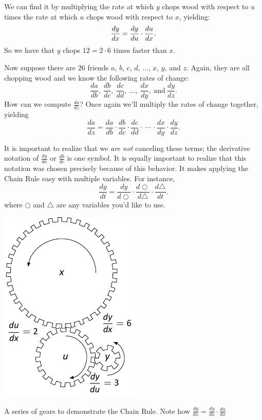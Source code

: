 We can find it by multiplying the rate at which $y$ chops wood with respect to $u$ times the rate at which $u$ chops wood with respect to $x$, yielding:
\[ \displaystyle \frac{dy}{dx} = \frac{dy}{du} \cdot \frac{du}{dx} . \]
So we have that $y$ chops $12 = 2 \cdot 6$ times faster than $x$.

Now suppose there are $26$ friends $a$, $b$, $c$, $d$, ..., $x$, $y$, and $z$.  Again, they are all chopping wood and we know the following rates of change:
\[ \frac{da}{db}, \ \frac{db}{dc}, \ \frac{dc}{dd}, \ ..., \ \frac{dx}{dy}, \ \mbox{and} \ \frac{dy}{dz}. \]
How can we compute $\frac{da}{dz}$?  Once again we'll multiply the rates of change together, yielding
\[ \frac{da}{dz} = \frac{da}{db} \cdot \frac{db}{dc} \cdot \frac{dc}{dd} \cdot \ \cdots \ \cdot \frac{dx}{dy} \cdot \frac{dy}{dz}. \]

It is important to realize that we \textit{are not} canceling these terms; the derivative notation of $\frac{dy}{dx}$ or $\frac{db}{dc}$ is one symbol. It is equally important to realize that this notation was chosen precisely because of this behavior. It makes applying the Chain Rule easy with multiple variables. For instance,
\[ \frac{dy}{dt} = \frac{dy}{d\bigcirc} \cdot \frac{d\bigcirc}{d\triangle} \cdot \frac{d\triangle}{dt}. \]
where $\bigcirc$ and $\triangle$ are any variables you'd like to use.

\begin{marginfigure} %
\begin{center}
\includegraphics{figures/figchainrulegears.pdf}
\end{center}
\caption{A series of gears to demonstrate the Chain Rule. Note how $\frac{dy}{dx} = \frac{dy}{du}\cdot\frac{du}{dx}$}
\label{fig:chainrulegears}
\end{marginfigure}

